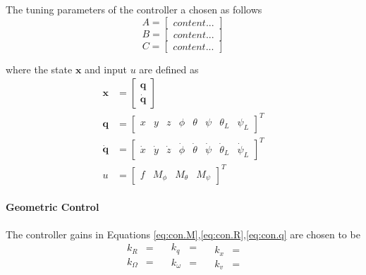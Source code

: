 The tuning parameters of the  controller a chosen as follows
\begin{equation}\label{key}
A=\begin{bmatrix}
content...
\end{bmatrix}
\end{equation}
\begin{equation}\label{key}
B=\begin{bmatrix}
content...
\end{bmatrix}
\end{equation}
\begin{equation}\label{key}
C=\begin{bmatrix}
content...
\end{bmatrix}
\end{equation}

where the state $ \mathbf{x} $ and input $ u $ are defined as 
\begin{align}\label{eq:state}
\textbf{x}&=\begin{bmatrix}
\textbf{q}\\
\mathbf{\dot{q}}
\end{bmatrix}\\
\mathbf{q}&=\begin{bmatrix}
x&y&z&\phi&\theta&\psi&\theta_L&\psi_L
\end{bmatrix}^T\\
\mathbf{\dot{q}}&=\begin{bmatrix}
\dot{x}&\dot{y}&\dot{z}&\dot{\phi}&\dot{\theta}&\dot{\psi}&\dot{\theta}_L&\dot{\psi}_L
\end{bmatrix}^T\\
u&=\begin{bmatrix}
f&M_\phi&M_\theta&M_\psi
\end{bmatrix}^T
\end{align}

\paragraph{Geometric Control}
The controller gains in Equations \ref{eq:con.M},\ref{eq:con.R},\ref{eq:con.q} are chosen to be
\begin{equation}\label{key}
\begin{aligned}
k_R&=\\
k_\Omega&=\\
\end{aligned}
\quad
\begin{aligned}
k_q&=\\
k_\omega&=\\
\end{aligned}
\quad
\begin{aligned}
k_x&=\\
k_v&=
\nonumber
\end{aligned}
\end{equation}



